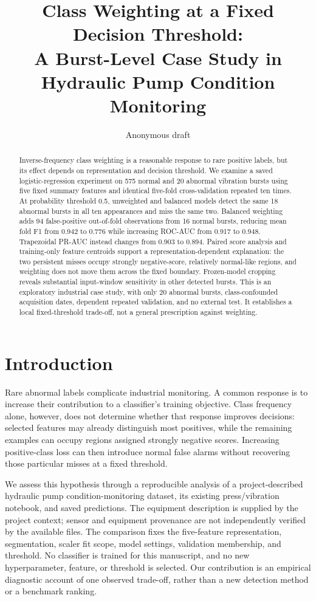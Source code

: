 \documentclass[10pt,twocolumn,letterpaper]{article}
\title{Class Weighting at a Fixed Decision Threshold:\\A Burst-Level Case Study in Hydraulic Pump Condition Monitoring}
\author{Anonymous draft}
\date{}
\begin{document}
\maketitle

\begin{abstract}
Inverse-frequency class weighting is a reasonable response to rare positive labels, but its effect depends on representation and decision threshold. We examine a saved logistic-regression experiment on 575 normal and 20 abnormal vibration bursts using five fixed summary features and identical five-fold cross-validation repeated ten times. At probability threshold 0.5, unweighted and balanced models detect the same 18 abnormal bursts in all ten appearances and miss the same two. Balanced weighting adds 94 false-positive out-of-fold observations from 16 normal bursts, reducing mean fold F1 from 0.942 to 0.776 while increasing ROC-AUC from 0.917 to 0.948. Trapezoidal PR-AUC instead changes from 0.903 to 0.894. Paired score analysis and training-only feature centroids support a representation-dependent explanation: the two persistent misses occupy strongly negative-score, relatively normal-like regions, and weighting does not move them across the fixed boundary. Frozen-model cropping reveals substantial input-window sensitivity in other detected bursts. This is an exploratory industrial case study, with only 20 abnormal bursts, class-confounded acquisition dates, dependent repeated validation, and no external test. It establishes a local fixed-threshold trade-off, not a general prescription against weighting.
\end{abstract}

\section{Introduction}
Rare abnormal labels complicate industrial monitoring. A common response is to increase their contribution to a classifier's training objective. Class frequency alone, however, does not determine whether that response improves decisions: selected features may already distinguish most positives, while the remaining examples can occupy regions assigned strongly negative scores. Increasing positive-class loss can then introduce normal false alarms without recovering those particular misses at a fixed threshold.

We assess this hypothesis through a reproducible analysis of a project-described hydraulic pump condition-monitoring dataset, its existing press/vibration notebook, and saved predictions. The equipment description is supplied by the project context; sensor and equipment provenance are not independently verified by the available files. The comparison fixes the five-feature representation, segmentation, scaler fit scope, model settings, validation membership, and threshold. No classifier is trained for this manuscript, and no new hyperparameter, feature, or threshold is selected. Our contribution is an empirical diagnostic account of one observed trade-off, rather than a new detection method or a benchmark ranking.
\end{document}
